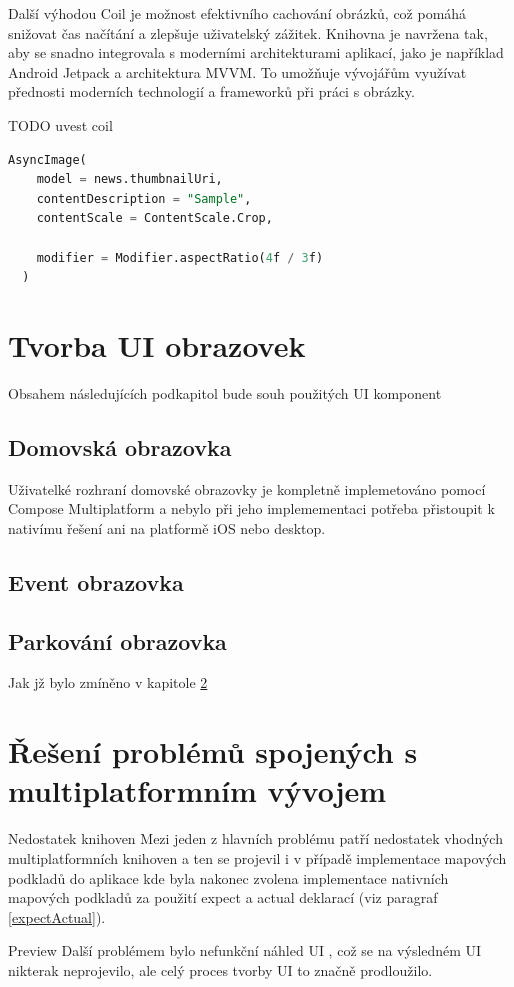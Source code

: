 Další výhodou Coil je možnost efektivního cachování obrázků, což pomáhá snižovat čas načítání a zlepšuje uživatelský zážitek. Knihovna je navržena tak, 
aby se snadno integrovala s moderními architekturami aplikací, jako je například Android Jetpack a architektura MVVM. To umožňuje vývojářům využívat 
přednosti moderních technologií a frameworků při práci s obrázky.

TODO uvest coil
\begin{lstlisting}[caption={Coil}, label={lst:Coil3}, language=SQL]
  AsyncImage(
    model = news.thumbnailUri,
    contentDescription = "Sample",
    contentScale = ContentScale.Crop,

    modifier = Modifier.aspectRatio(4f / 3f)
  )
\end{lstlisting}


\section{Tvorba UI obrazovek}
Obsahem následujících podkapitol bude souh použitých UI komponent
\subsection{Domovská obrazovka}
Uživatelké rozhraní domovské obrazovky je kompletně implemetováno pomocí Compose Multiplatform a nebylo při jeho implemementaci potřeba
přistoupit k nativímu řešení ani na platformě iOS nebo desktop. 
\subsection{Event obrazovka}
\subsection{Parkování obrazovka}
Jak jž bylo zmíněno v kapitole \ref{}



\section{Řešení problémů spojených s multiplatformním vývojem}
Nedostatek knihoven
Mezi jeden z hlavních problému patří nedostatek vhodných multiplatformních knihoven a ten se projevil i v případě implementace mapových podkladů
do aplikace kde byla nakonec zvolena implementace nativních mapových podkladů za použití expect a actual deklarací (viz paragraf \ref{expectActual}).

Preview
Další problémem bylo nefunkční náhled UI , což se na výsledném UI nikterak neprojevilo, ale celý proces tvorby UI to značně prodloužilo.

